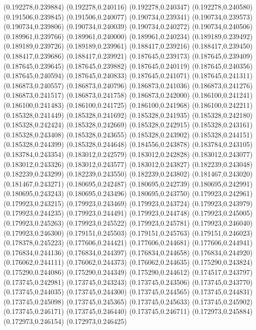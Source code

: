 (0.192278,0.239884)
(0.192278,0.240116)
(0.192278,0.240347)
(0.192278,0.240580)
(0.191506,0.239845)
(0.191506,0.240077)
(0.190734,0.239341)
(0.190734,0.239573)
(0.190734,0.239806)
(0.190734,0.240039)
(0.190734,0.240272)
(0.190734,0.240506)
(0.189961,0.239766)
(0.189961,0.240000)
(0.189961,0.240234)
(0.189189,0.239492)
(0.189189,0.239726)
(0.189189,0.239961)
(0.188417,0.239216)
(0.188417,0.239450)
(0.188417,0.239686)
(0.188417,0.239921)
(0.187645,0.239173)
(0.187645,0.239409)
(0.187645,0.239645)
(0.187645,0.239882)
(0.187645,0.240119)
(0.187645,0.240356)
(0.187645,0.240594)
(0.187645,0.240833)
(0.187645,0.241071)
(0.187645,0.241311)
(0.186873,0.240557)
(0.186873,0.240796)
(0.186873,0.241036)
(0.186873,0.241276)
(0.186873,0.241517)
(0.186873,0.241758)
(0.186873,0.242000)
(0.186100,0.241241)
(0.186100,0.241483)
(0.186100,0.241725)
(0.186100,0.241968)
(0.186100,0.242211)
(0.185328,0.241449)
(0.185328,0.241692)
(0.185328,0.241935)
(0.185328,0.242180)
(0.185328,0.242424)
(0.185328,0.242669)
(0.185328,0.242915)
(0.185328,0.243161)
(0.185328,0.243408)
(0.185328,0.243655)
(0.185328,0.243902)
(0.185328,0.244151)
(0.185328,0.244399)
(0.185328,0.244648)
(0.184556,0.243878)
(0.183784,0.243105)
(0.183784,0.243354)
(0.183012,0.242579)
(0.183012,0.242828)
(0.183012,0.243077)
(0.183012,0.243326)
(0.183012,0.243577)
(0.183012,0.243827)
(0.182239,0.243048)
(0.182239,0.243299)
(0.182239,0.243550)
(0.182239,0.243802)
(0.181467,0.243020)
(0.181467,0.243271)
(0.180695,0.242487)
(0.180695,0.242739)
(0.180695,0.242991)
(0.180695,0.243243)
(0.180695,0.243496)
(0.180695,0.243750)
(0.179923,0.242961)
(0.179923,0.243215)
(0.179923,0.243469)
(0.179923,0.243724)
(0.179923,0.243979)
(0.179923,0.244235)
(0.179923,0.244491)
(0.179923,0.244748)
(0.179923,0.245005)
(0.179923,0.245263)
(0.179923,0.245522)
(0.179923,0.245781)
(0.179923,0.246040)
(0.179923,0.246300)
(0.179151,0.245503)
(0.179151,0.245763)
(0.179151,0.246023)
(0.178378,0.245223)
(0.177606,0.244421)
(0.177606,0.244681)
(0.177606,0.244941)
(0.176834,0.244136)
(0.176834,0.244397)
(0.176834,0.244658)
(0.176834,0.244920)
(0.176062,0.244111)
(0.176062,0.244373)
(0.176062,0.244635)
(0.175290,0.243824)
(0.175290,0.244086)
(0.175290,0.244349)
(0.175290,0.244612)
(0.174517,0.243797)
(0.173745,0.242981)
(0.173745,0.243243)
(0.173745,0.243506)
(0.173745,0.243770)
(0.173745,0.244035)
(0.173745,0.244300)
(0.173745,0.244565)
(0.173745,0.244831)
(0.173745,0.245098)
(0.173745,0.245365)
(0.173745,0.245633)
(0.173745,0.245902)
(0.173745,0.246171)
(0.173745,0.246440)
(0.173745,0.246711)
(0.172973,0.245884)
(0.172973,0.246154)
(0.172973,0.246425)

